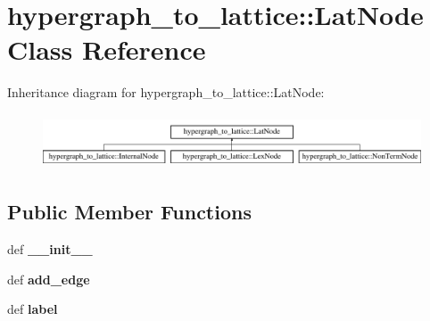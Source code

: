 \hypertarget{classhypergraph__to__lattice_1_1LatNode}{
\section{hypergraph\_\-to\_\-lattice::LatNode Class Reference}
\label{classhypergraph__to__lattice_1_1LatNode}
}
Inheritance diagram for hypergraph\_\-to\_\-lattice::LatNode:\begin{figure}[H]
\begin{center}
\leavevmode
\includegraphics[height=1.62319cm]{classhypergraph__to__lattice_1_1LatNode}
\end{center}
\end{figure}
\subsection*{Public Member Functions}
\begin{DoxyCompactItemize}
\item 
\hypertarget{classhypergraph__to__lattice_1_1LatNode_a7ab7ecd3c4e28aae3399ca31b07ee9d7}{
def {\bfseries \_\-\_\-init\_\-\_\-}}
\label{classhypergraph__to__lattice_1_1LatNode_a7ab7ecd3c4e28aae3399ca31b07ee9d7}

\item 
\hypertarget{classhypergraph__to__lattice_1_1LatNode_ae89f6b1705c3cae56321ab5ab8143fcf}{
def {\bfseries add\_\-edge}}
\label{classhypergraph__to__lattice_1_1LatNode_ae89f6b1705c3cae56321ab5ab8143fcf}

\item 
\hypertarget{classhypergraph__to__lattice_1_1LatNode_a36f8416f81cf50bff472fba2a161472d}{
def {\bfseries label}}
\label{classhypergraph__to__lattice_1_1LatNode_a36f8416f81cf50bff472fba2a161472d}

\end{DoxyCompactItemize}
